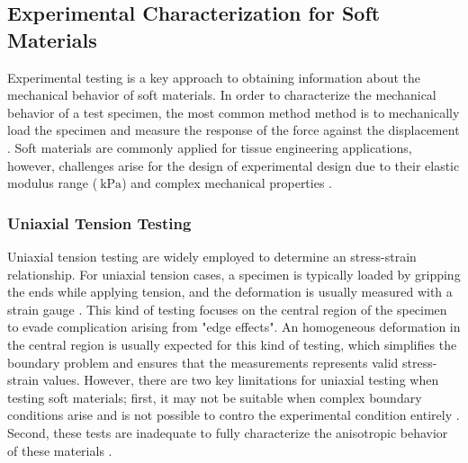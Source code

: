 \subsection{Experimental Characterization for Soft Materials}
\label{subsection:experimentalcharacterization}
Experimental testing is a key approach to obtaining information about the mechanical behavior of soft materials.
In order to characterize the mechanical behavior of a test specimen, the most common method
method is to mechanically load the specimen and measure the response of the force against 
the displacement \cite{Bergström2015}. Soft materials are commonly applied 
for tissue engineering applications, however, challenges arise for the 
design of experimental design due to their elastic modulus range ($\SI{}{\kilo \pascal}$) and complex
mechanical properties \cite{Liu2009}.\\



\subsubsection*{Uniaxial Tension Testing}

Uniaxial tension testing are widely employed to determine an stress-strain relationship.
For uniaxial tension cases, a specimen is typically loaded by gripping the ends while applying 
tension, and the deformation is usually measured with a strain gauge \cite{Bergström2015}.
This kind of testing focuses on the central region of the specimen to evade complication arising from 
"edge effects". An homogeneous deformation in the central region is usually expected for this kind of testing, 
which simplifies the boundary problem and ensures that the measurements represents valid stress-strain values.
However, there are two key limitations for uniaxial testing when testing soft materials; first, 
it may not be suitable when complex boundary conditions arise and is not possible to contro the 
experimental condition entirely \cite{Seshaiyer2003}. Second, these tests are inadequate to 
fully characterize the anisotropic behavior of these materials \cite{Cox2006}.\\

